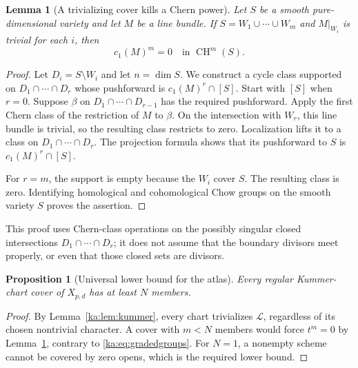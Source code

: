 \documentclass[11pt,a4paper]{article}
\newtheorem{lemma}[theorem]{Lemma}
\newtheorem{proposition}[theorem]{Proposition}
\theoremstyle{definition}
\theoremstyle{remark}
\newcommand{\LL}{\mathcal L}
\newcommand{\CH}{\operatorname{CH}}
\begin{document}
\begin{lemma}[A trivializing cover kills a Chern power]
\label{ka:lem:covernilpotence}
Let $S$ be a smooth pure-dimensional variety and let $M$ be a line
bundle. If $S=W_1\cup\cdots\cup W_m$ and $M|_{W_i}$ is trivial for
each $i$, then
\begin{equation}
 c_1(M)^m=0\quad\text{in }\CH^m(S).
 \label{ka:eq:covernilpotence}
\end{equation}
\end{lemma}
\begin{proof}
Let $D_i=S\setminus W_i$ and let $n=\dim S$.
We construct a cycle class supported on
$D_1\cap\cdots\cap D_r$ whose pushforward is
$c_1(M)^r\cap[S]$. Start with $[S]$ when $r=0$.
Suppose $\beta$ on $D_1\cap\cdots\cap D_{r-1}$ has the required
pushforward. Apply the first Chern class of the restriction of $M$ to
$\beta$. On the intersection with $W_r$, this line bundle is trivial,
so the resulting class restricts to zero. Localization lifts it to a
class on $D_1\cap\cdots\cap D_r$. The projection formula shows that
its pushforward to $S$ is $c_1(M)^r\cap[S]$.

For $r=m$, the support is empty because the $W_i$ cover $S$.
The resulting class is zero. Identifying homological and cohomological
Chow groups on the smooth variety $S$ proves the assertion.
\end{proof}

This proof uses Chern-class operations on the possibly singular closed
intersections $D_1\cap\cdots\cap D_r$; it does not assume that the
boundary divisors meet properly, or even that those closed sets are
divisors.

\begin{proposition}[Universal lower bound for the atlas]
\label{ka:prop:atlaslower}
Every regular Kummer-chart cover of $X_{p,d}$ has at least $N$ members.
\end{proposition}
\begin{proof}
By Lemma~\ref{ka:lem:kummer}, every chart trivializes $\LL$, regardless
of its chosen nontrivial character. A cover with $m<N$ members would
force $t^m=0$ by Lemma~\ref{ka:lem:covernilpotence}, contrary to
\eqref{ka:eq:gradedgroups}. For $N=1$, a nonempty scheme cannot be
covered by zero opens, which is the required lower bound.
\end{proof}
\end{document}
